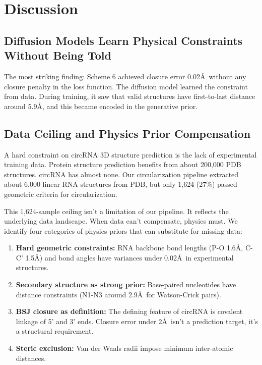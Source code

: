 \documentclass[12pt]{article}
\begin{document}
\section{Discussion}

\subsection{Diffusion Models Learn Physical Constraints Without Being Told}

The most striking finding: Scheme 6 achieved closure error 0.02\AA\ without any closure penalty in the loss function. The diffusion model learned the constraint from data. During training, it saw that valid structures have first-to-last distance around 5.9\AA, and this became encoded in the generative prior.

\subsection{Data Ceiling and Physics Prior Compensation}

A hard constraint on circRNA 3D structure prediction is the lack of experimental training data. Protein structure prediction benefits from about 200,000 PDB structures. circRNA has almost none. Our circularization pipeline extracted about 6,000 linear RNA structures from PDB, but only 1,624 (27\%) passed geometric criteria for circularization.

This 1,624-sample ceiling isn't a limitation of our pipeline. It reflects the underlying data landscape. When data can't compensate, physics must. We identify four categories of physics priors that can substitute for missing data:

\begin{enumerate}
\item \textbf{Hard geometric constraints:} RNA backbone bond lengths (P-O 1.6\AA, C-C' 1.5\AA) and bond angles have variances under 0.02\AA\ in experimental structures.

\item \textbf{Secondary structure as strong prior:} Base-paired nucleotides have distance constraints (N1-N3 around 2.9\AA\ for Watson-Crick pairs).

\item \textbf{BSJ closure as definition:} The defining feature of circRNA is covalent linkage of 5' and 3' ends. Closure error under 2\AA\ isn't a prediction target, it's a structural requirement.

\item \textbf{Steric exclusion:} Van der Waals radii impose minimum inter-atomic distances.
\end{enumerate}
\end{document}

